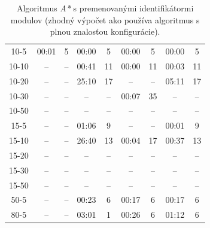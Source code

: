 \documentclass[
  printed, %
  oneside, %
  notable,   %
  nolof,     %
  nolot,     %
]{fithesis3}
\begin{document}
\begin{table}[hp!]
\begin{tabular}{c|cc|cc|cc|cc}
10-5  & 00:01 & 5  & 00:00 & 5  & \cellcolor{table-green}00:00 & \cellcolor{table-green}5  & 00:00 & 5  \\
10-10  & -- & --  & 00:41 & 11  & \cellcolor{table-green}00:00 & \cellcolor{table-green}11  & 00:03 & 11  \\
10-20  & -- & --  & 25:10 & 17  & -- & --  & \cellcolor{table-green}05:11 & \cellcolor{table-green}17  \\
10-30  & -- & --  & -- & --  & \cellcolor{table-green}00:07 & \cellcolor{table-green}35  & -- & --  \\
10-50  & -- & --  & -- & --  & -- & --  & -- & --  \\ \hline
15-5  & -- & --  & 01:06 & 9  & -- & --  & \cellcolor{table-green}00:01 & \cellcolor{table-green}9  \\
15-10  & -- & --  & 26:40 & 13  & \cellcolor{table-green}00:04 & \cellcolor{table-green}17  & 00:37 & 13  \\
15-20  & -- & --  & -- & --  & -- & --  & -- & --  \\
15-30  & -- & --  & -- & --  & -- & --  & -- & --  \\
15-50  & -- & --  & -- & --  & -- & --  & -- & --  \\ \hline
50-5  & -- & --  & 00:23 & 6  & \cellcolor{table-green}00:17 & \cellcolor{table-green}6  & 00:17 & 6  \\ \hline
80-5 & -- & -- & 03:01 & 1 & \cellcolor{table-green}00:26 & \cellcolor{table-green}6 & 01:12 & 6 \\
\end{tabular}%
\caption{Algoritmus \textit{A*} s premenovanými identifikátormi modulov (zhodný výpočet ako používa algoritmus s plnou znalosťou konfigurácie). }
\label{tab:astar-renamed}
\end{table}
\end{document}
